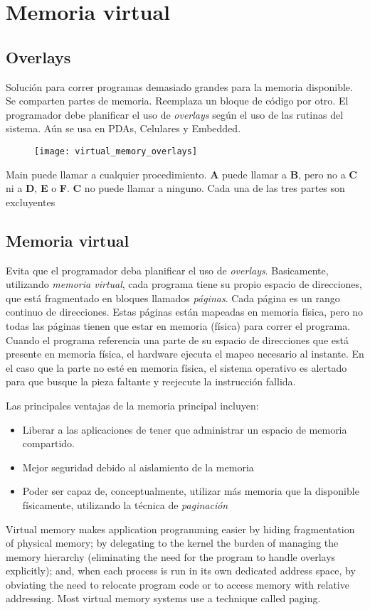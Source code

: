 \documentclass[a4paper, twoside]{article}
\begin{document}
\section{Memoria virtual}

\subsection{Overlays}
Solución para correr programas demasiado grandes para la memoria disponible. Se comparten partes de memoria.
Reemplaza un bloque de código por otro.
El programador debe planificar el uso de \emph{overlays} según el uso de las rutinas del sistema.
Aún se usa en PDAs, Celulares y Embedded.

\begin{figure}[H]
	\centering
	\texttt{[image: virtual\_memory\_overlays]}
	\label{fig:virtual_memory_overlays}
\end{figure}
Main puede llamar a cualquier procedimiento.
\textbf{A} puede llamar a \textbf{B}, pero no a \textbf{C} ni a \textbf{D}, \textbf{E} o \textbf{F}. \textbf{C} no puede llamar a ninguno.
Cada una de las tres partes son excluyentes

\subsection{Memoria virtual}
Evita que el programador deba planificar el uso de \emph{overlays}.
Basicamente, utilizando \emph{memoria virtual}, cada programa tiene su propio espacio de direcciones, que está fragmentado en bloques llamados \emph{páginas}. Cada página es un rango continuo de direcciones. Estas páginas están mapeadas en memoria física, pero no todas las páginas tienen que estar en memoria (física) para correr el programa.
Cuando el programa referencia una parte de su espacio de direcciones que está presente en memoria física, el hardware ejecuta el mapeo necesario al instante. En el caso que la parte no esté en memoria física, el sistema operativo es alertado para que busque la pieza faltante y reejecute la instrucción fallida.

Las principales ventajas de la memoria principal incluyen:
\begin{itemize}
	\item Liberar a las aplicaciones de tener que administrar un espacio de memoria compartido.
	\item Mejor seguridad debido al aislamiento de la memoria
	\item Poder ser capaz de, conceptualmente, utilizar más memoria que la disponible físicamente, utilizando la técnica de \emph{paginación}
\end{itemize}
Virtual memory makes application programming easier by hiding fragmentation of physical memory; by delegating to the kernel the burden of managing the memory hierarchy (eliminating the need for the program to handle overlays explicitly); and, when each process is run in its own dedicated address space, by obviating the need to relocate program code or to access memory with relative addressing.
Most virtual memory systems use a technique called paging.
\end{document}
